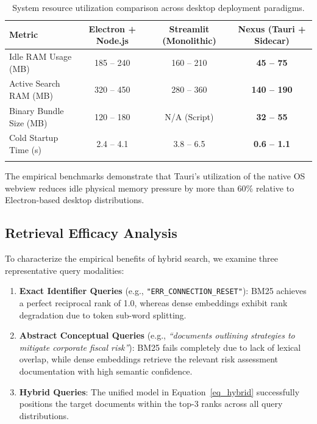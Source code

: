 \documentclass[pdflatex,sn-mathphys-num]{sn-jnl}%
\theoremstyle{thmstyleone}%
\theoremstyle{thmstyletwo}%
\theoremstyle{thmstylethree}%
\begin{document}
\begin{table}[h]
\caption{System resource utilization comparison across desktop deployment paradigms.}\label{tab_resources}
\begin{tabular*}{\textwidth}{@{\extracolsep\fill}lccc@{}}
\toprule
\textbf{Metric} & \textbf{Electron + Node.js} & \textbf{Streamlit (Monolithic)} & \textbf{Nexus (Tauri + Sidecar)} \\
\midrule
Idle RAM Usage (MB) & 185 -- 240 & 160 -- 210 & \textbf{45 -- 75} \\
Active Search RAM (MB) & 320 -- 450 & 280 -- 360 & \textbf{140 -- 190} \\
Binary Bundle Size (MB) & 120 -- 180 & N/A (Script) & \textbf{32 -- 55} \\
Cold Startup Time (s) & 2.4 -- 4.1 & 3.8 -- 6.5 & \textbf{0.6 -- 1.1} \\
\botrule
\end{tabular*}
\end{table}

The empirical benchmarks demonstrate that Tauri's utilization of the native OS webview reduces idle physical memory pressure by more than 60\% relative to Electron-based desktop distributions.

\subsection{Retrieval Efficacy Analysis}\label{subsec7_2}
To characterize the empirical benefits of hybrid search, we examine three representative query modalities:
\begin{enumerate}
    \item \textbf{Exact Identifier Queries} (e.g., \texttt{"ERR\_CONNECTION\_RESET"}): BM25 achieves a perfect reciprocal rank of 1.0, whereas dense embeddings exhibit rank degradation due to token sub-word splitting.
    \item \textbf{Abstract Conceptual Queries} (e.g., \textit{``documents outlining strategies to mitigate corporate fiscal risk''}): BM25 fails completely due to lack of lexical overlap, while dense embeddings retrieve the relevant risk assessment documentation with high semantic confidence.
    \item \textbf{Hybrid Queries}: The unified model in Equation~\ref{eq_hybrid} successfully positions the target documents within the top-3 ranks across all query distributions.
\end{enumerate}

\end{document}

